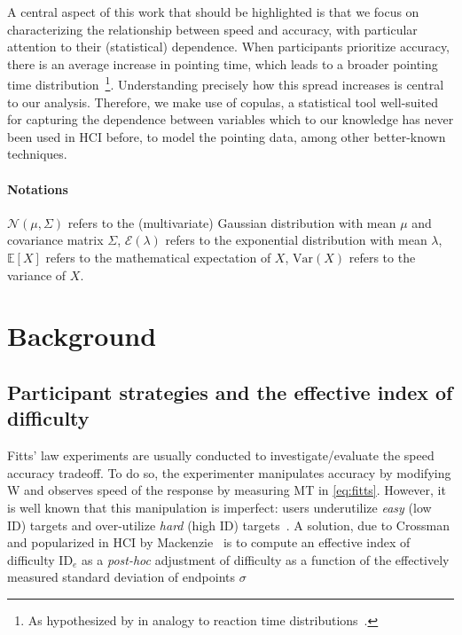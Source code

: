\documentclass[manuscript,review,anonymous]{acmart}
\newcommand{\ide}{\ensuremath{{\text{ID}_e}}\xspace}
\begin{document}
A central aspect of this work that should be highlighted is that we focus on characterizing the relationship between speed and accuracy, with particular attention to their (statistical) dependence. When participants prioritize accuracy, there is an average increase in pointing time, which leads to a broader pointing time distribution~\cite{gori2019, li2024, zhao2022}\footnote{As hypothesized by \cite[p. 132]{gori2018these} in analogy to reaction time distributions~\cite{wagenmakers2007}.}. Understanding precisely how this spread increases is central to our analysis. Therefore, we make use of copulas, a statistical tool well-suited for capturing the dependence between variables which to our knowledge has never been used in HCI before, to model the pointing data, among other better-known techniques.





\paragraph{Notations} $\mathcal{N}(\mu, \Sigma)$ refers to the (multivariate) Gaussian distribution with mean $\mu$ and covariance matrix $\Sigma$, $\mathcal{E}(\lambda)$ refers to the exponential distribution with mean $\lambda$, $\mathbb{E}[X]$ refers to the mathematical expectation of $X$, $\text{Var}(X)$ refers to the variance of $X$.

\section{Background}


\subsection{Participant strategies and the effective index of difficulty}
Fitts' law experiments are usually conducted to investigate/evaluate the speed accuracy tradeoff. To do so, the experimenter manipulates accuracy by modifying W and observes speed of the response by measuring MT in \autoref{eq:fitts}. However, it is well known that this manipulation is imperfect: users underutilize \textit{easy} (low ID) targets and over-utilize \textit{hard} (high ID) targets~\cite{guiard2011,zhai2004nominal}.
A solution, due to Crossman and popularized in HCI by Mackenzie~\cite{gori2018tochi} is to compute an effective index of difficulty \ide  as a \textit{post-hoc} adjustment of difficulty as a function of the effectively measured standard deviation of endpoints $\sigma$
\end{document}
